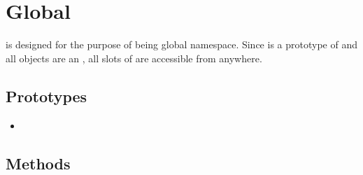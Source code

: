 \section{Global}

 is designed for the purpose of being global
namespace. Since  is a prototype of  and all
objects are an , all slots of  are accessible from
anywhere.

\subsection{Prototypes}
\begin{itemize}
\item {}
\end{itemize}

\subsection{Methods}

